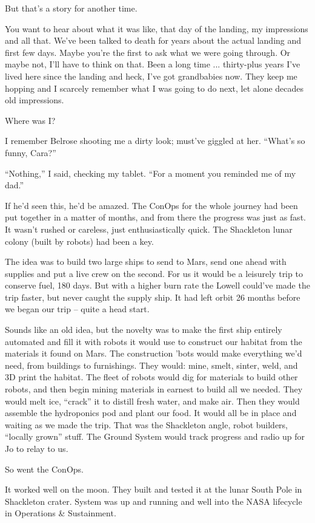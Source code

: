 \documentclass[11pt,a4paper]{article}
\begin{document}
But that’s a story for another time.

You want to hear about what it was like, that day of the landing, my impressions and all that. We’ve been talked to death for years about the actual landing and first few days. Maybe you’re the first to ask what we were going through. Or maybe not, I’ll have to think on that. Been a long time ... thirty-plus years I’ve lived here since the landing and heck, I’ve got grandbabies now. They keep me hopping and I scarcely remember what I was going to do next, let alone decades old impressions.

Where was I?

I remember Belrose shooting me a dirty look; must’ve giggled at her. “What’s so funny, Cara?”

“Nothing,” I said, checking my tablet. “For a moment you reminded me of my dad.”

If he’d seen this, he’d be amazed. The ConOps for the whole journey had been put together in a matter of months, and from there the progress was just as fast. It wasn’t rushed or careless, just enthusiastically quick. The Shackleton lunar colony (built by robots) had been a key.

The idea was to build two large ships to send to Mars, send one ahead with supplies and put a live crew on the second. For us it would be a leisurely trip to conserve fuel, 180 days. But with a higher burn rate the Lowell could’ve made the trip faster, but never caught the supply ship. It had left orbit 26 months before we began our trip – quite a head start.

Sounds like an old idea, but the novelty was to make the first ship entirely automated and fill it with robots it would use to construct our habitat from the materials it found on Mars. The construction ’bots would make everything we’d need, from buildings to furnishings. They would: mine, smelt, sinter, weld, and 3D print the habitat. The fleet of robots would dig for materials to build other robots, and then begin mining materials in earnest to build all we needed. They would melt ice, “crack” it to distill fresh water, and make air. Then they would assemble the hydroponics pod and plant our food. It would all be in place and waiting as we made the trip. That was the Shackleton angle, robot builders, “locally grown” stuff. The Ground System would track progress and radio up for Jo to relay to us.

So went the ConOps.

It worked well on the moon. They built and tested it at the lunar South Pole in Shackleton crater. System was up and running and well into the NASA lifecycle in Operations \& Sustainment.
\end{document}
